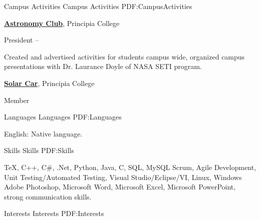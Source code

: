 \documentclass[a4paper,MMMyyyy,nonstopmode]{simpleresumecv}
\begin{document}
\begin{Body}





\Section
{Campus Activities}
{Campus Activities}
{PDF:CampusActivities}

\Entry
\href{http://www.example.com/my-club}
{\textbf{Astronomy Club}},
Principia College

\Gap
\BulletItem
President
\hfill
{} --
\begin{Detail}
\SubBulletItem
Created and advertised activities for students campus wide, organized campus presentations with Dr. Laurance Doyle of NASA SETI program.

\Entry
\Gap
\href{https://www.principiasolarcar.com/}
{\textbf{Solar Car}},
Principia College

\BulletItem
Member
\end{Detail}


\Section
{Languages}
{Languages}
{PDF:Languages}

\BulletItem
English: Native language.


\Section
{Skills}
{Skills}
{PDF:Skills}

\Entry
{\TeX},
C++,
C\#,
.Net,
Python,
Java,
C,
SQL, MySQL
Scrum,
Agile Development,
Unit Testing/Automated Testing,
Visual Studio/Eclipse/VI,
Linux, Windows
Adobe Photoshop,
Microsoft Word,
Microsoft Excel,
Microsoft PowerPoint,
strong communication skills.


\Section
{Interests}
{Interests}
{PDF:Interests}


\end{Body}
\end{document}
